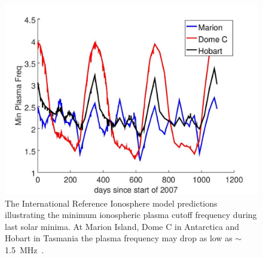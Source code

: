 \begin{figure}
	\centering
	\includegraphics[width=\linewidth]{Figures/IRI_model}
	\caption{The International Reference Ionosphere model predictions illustrating the minimum ionospheric plasma cutoff frequency during last solar minima. At Marion Island, Dome C in Antarctica and Hobart in Tasmania the plasma frequency may drop as low as $\sim$\SI{1.5}{\mega\hertz}~\citep{2020arXiv200812208C}.}
	\label{fig:IRI_model}
\end{figure}